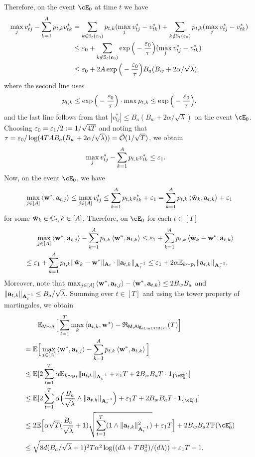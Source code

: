 Therefore, on the event $\cE_0$ at time $t$ we have
\begin{align*}
    \max_{j}v^*_{tj}-\sum_{k=1}^A p_{t,k}v^*_{tk}&= \sum_{k\in{\mathbb{S}}_t(\varepsilon_0)} p_{t,k}(\max_{j}v^*_{tj}-v^*_{tk})+\sum_{k\notin{\mathbb{S}}_t(\varepsilon_0)} p_{t,k}(\max_{j}v^*_{tj}-v^*_{tk})\\
    &\leq \varepsilon_0+\sum_{k\notin{\mathbb{S}}_t(\varepsilon_0)} \exp\Big(-\frac{\varepsilon_0}{{\tau}}\Big)(\max_{j}v^*_{tj}-v^*_{tk})\\
    &\leq \varepsilon_0+2A\exp\Big(-\frac{\varepsilon_0}{{\tau}}\Big)B_a(B_w+2\alpha/\sqrt{\lambda}),
\end{align*}
where the second line uses $$
p_{t,k}\leq\exp\Big(-\frac{\varepsilon_0}{{\tau}}\Big)\cdot\max{p_{t,k}}\leq \exp\Big(-\frac{\varepsilon_0}{{\tau}}\Big),
$$ and the  last line follows from that $|v^*_{tj}|\leq B_a(B_w+2\alpha/\sqrt{\lambda})$
 on the event $\cE_0$. Choosing $\varepsilon_0=\varepsilon_1/2:=1/\sqrt{4T}$ and noting that ${\tau}=\varepsilon_0/\log(4TA B_a(B_w+2\alpha/\sqrt{\lambda}))={\tilde{\mathcal O}}(1/\sqrt{T})$, we obtain 
 \begin{align*}
    \max_{j}v^*_{tj}-\sum_{k=1}^A p_{t,k}v^*_{tk}&\leq\varepsilon_1.
\end{align*}
Now, on the event $\cE_0$, we have
\begin{align*}
    \max_{j\in[A]}\left\langle{\mathbf w}^*,{\mathbf a}_{t,j}\right\rangle\leq  \max_{j\in[A]}v^*_{tj}\leq \sum_{k=1}^A p_{t,k}v^*_{tk}+\varepsilon_1 =\sum_{k=1}^A p_{t,k}\left\langle\tilde{{\mathbf w}}_k,{\mathbf a}_{t,k}\right\rangle+\varepsilon_1
\end{align*}
for some $\tilde{{\mathbf w}}_k\in{\mathbb{C}}_t,k\in[A]$.
Therefore,  on $\cE_0$ for  each $t\in[T]$
\begin{align*}
    &~~\quad\max_{j\in[A]}\left\langle{\mathbf w}^*,{\mathbf a}_{t,j}\right\rangle-\sum_{k=1}^Ap_{t,k}\left\langle{\mathbf w}^*,{\mathbf a}_{t,k}\right\rangle
    \leq \varepsilon_1+ \sum_{k=1}^Ap_{t,k}\left\langle\tilde{{\mathbf w}}_k-{\mathbf w}^*,{\mathbf a}_{t,k}\right\rangle
    \\&\leq  
    \varepsilon_1+\sum_{k=1}^Ap_{t,k}\|\tilde{{\mathbf w}}_k-{\mathbf w}^*\|_{{\mathbf A}_t}\cdot\|{\mathbf a}_{t,k}\|_{{\mathbf A}^{-1}_t}
    \leq \varepsilon_1+ 2\alpha\mathbb{E}_{k\sim {\mathbf p}_t}\|{\mathbf a}_{t,k}\|_{{\mathbf A}^{-1}_t}.
\end{align*}
 Moreover, note that $ \max_{j\in[A]}\left\langle{\mathbf w}^*,{\mathbf a}_{t,j}\right\rangle-\left\langle{\mathbf w}^*,{\mathbf a}_{t,k}\right\rangle\leq 2B_wB_a$ and $\|{\mathbf a}_{t,k}\|_{{\mathbf A}^{-1}_t}\leq B_a/\sqrt{\lambda}$.
Summing over $t\in[T]$ and using the tower property of martingales, we obtain
\begin{align*}
&\qquad\E_{\inst\sim\prior}\Big[\sum_{t=1}^\totlen\max_{k}\<\ba_{t,k},\bw^*\>-\totreward_{\inst,\sAlg_{\sLinUCB(\temp)}}(\totlen)\Big]\\
&=
\E\Big[\max_{j\in[A]}\<\bw^*,\ba_{t,j}\>-\sum_{k=1}^Ap_{t,k}\<\bw^*,\ba_{t,k}\>
 \Big]   
\\
&\leq \E[2\sum_{t=1}^T\alpha\E_{k\sim \bp_t}\|\ba_{t,k}\|_{\bA^{-1}_t}+\eps_1 T +2B_wB_a T\cdot\mathbf{1}_{\{\cE^c_0\}}]\\
   &\leq
\E[2\sum_{t=1}^T\alpha\Big(\frac{B_a}{\sqrt{\lambda}}\wedge\|\ba_{t,k}\|_{\bA^{-1}_t}\Big)+\eps_1 T +2B_wB_a T\cdot\mathbf{1}_{\{\cE^c_0\}}]\\
   &\leq 
2\E\Big[\alpha\sqrt{T}(\frac{B_a}{\sqrt{\lambda}}+1)\sqrt{\sum_{t=1}^T(1\wedge\|\ba_{t,k}\|^2_{\bA^{-1}_t})}+\eps_1 T\Big]+2B_wB_a T\P(\cE^c_0)\\
&\leq 
\sqrt{8 d({B_a}/{\sqrt{\lambda}}+1)^2T\alpha^2\log((d\lambda+TB_a^2)/(d\lambda))}+\eps_1 T+1,
\end{align*}
